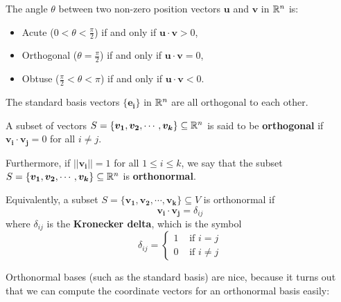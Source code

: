 \begin{proposition}
    The angle $\theta$ between two non-zero position vectors $\bm{u}$ and $\bm{v}$ in $\mathbb{R}^n$ is:
    \begin{itemize}
        \item Acute ($0 < \theta < \frac{\pi}{2}$) if and only if  $\bm{u} \cdot \bm{v} > 0$,
        \item Orthogonal ($\theta = \frac{\pi}{2}$) if and only if $\bm{u} \cdot \bm{v} = 0$,
        \item Obtuse ($\frac{\pi}{2} < \theta < \pi$) if and only if $\bm{u} \cdot \bm{v} < 0$.
    \end{itemize}
    
    \end{proposition}   

\begin{example}
    The standard basis vectors $\{\bm{e_i}\}$ in $\mathbb{R}^n$ are all orthogonal to each other.
\end{example}


\begin{definition}
    A subset of vectors $S = \{\bm{v_1}, \bm{v_2}, \cdots, \bm{v_k}\} \subseteq \mathbb{R}^n$ is said to be \textbf{orthogonal} if $ \bm{v_i} \cdot \bm{v_j}= 0$ for all $i \neq j$.
    
    \vspace{1em}
    
    Furthermore, if $||\bm{v_i}|| = 1$ for all $1 \leq i \leq k$, we say that the subset $S = \{\bm{v_1}, \bm{v_2}, \cdots, \bm{v_k}\} \subseteq \mathbb{R}^n$ is \textbf{orthonormal}.
\end{definition}

\begin{proposition}
        Equivalently, a subset $S = \{\bm{v_1}, \bm{v_2}, \cdots, \bm{v_k}\} \subseteq V$ is orthonormal if $$\bm{v_i} \cdot \bm{v_j} = \delta_{ij}$$ 
        where $\delta_{ij}$ is the \textbf{Kronecker delta}, which is the symbol $$\delta_{ij} = \left\{
		\begin{array}{ll}
			1 & \text{ if } i = j \\
			0 & \text{ if } i \neq j
		\end{array}
		\right.$$
    \end{proposition}

Orthonormal bases (such as the standard basis) are nice, because it turns out that we can compute the coordinate vectors for an orthonormal basis easily:


